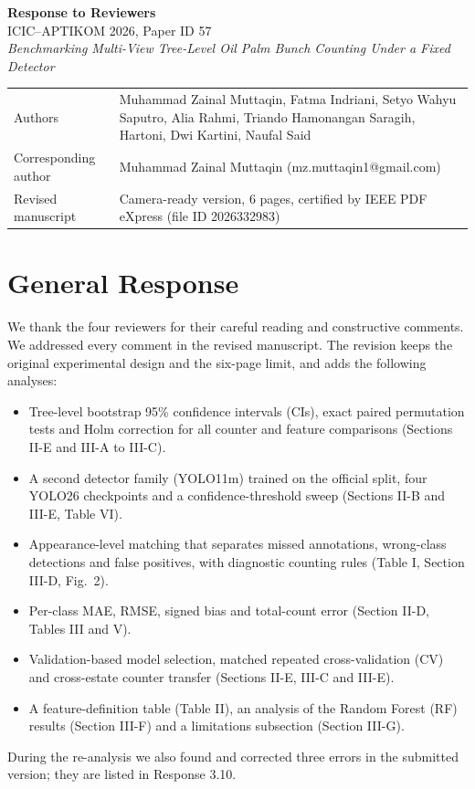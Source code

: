 \documentclass[10pt,a4paper]{article}
\begin{document}
\begin{center}
{\LARGE\bfseries Response to Reviewers}\\[6pt]
{\large ICIC--APTIKOM 2026, Paper ID 57}\\[4pt]
\textit{Benchmarking Multi-View Tree-Level Oil Palm Bunch Counting Under a Fixed Detector}
\end{center}

\vspace{2pt}
\begin{tabularx}{\textwidth}{@{}lX@{}}
Authors & Muhammad Zainal Muttaqin, Fatma Indriani, Setyo Wahyu Saputro, Alia Rahmi,
          Triando Hamonangan Saragih, Hartoni, Dwi Kartini, Naufal Said\\
Corresponding author & Muhammad Zainal Muttaqin (mz.muttaqin1@gmail.com)\\
Revised manuscript & Camera-ready version, 6 pages, certified by IEEE PDF eXpress (file ID 2026332983)\\
\end{tabularx}

\section{General Response}
We thank the four reviewers for their careful reading and constructive comments. We
addressed every comment in the revised manuscript. The revision keeps the original
experimental design and the six-page limit, and adds the following analyses:
\begin{itemize}
\item Tree-level bootstrap 95\% confidence intervals (CIs), exact paired permutation
  tests and Holm correction for all counter and feature comparisons
  (Sections II-E and III-A to III-C).
\item A second detector family (YOLO11m) trained on the official split, four YOLO26
  checkpoints and a confidence-threshold sweep (Sections II-B and III-E, Table VI).
\item Appearance-level matching that separates missed annotations, wrong-class
  detections and false positives, with diagnostic counting rules
  (Table I, Section III-D, Fig.~2).
\item Per-class MAE, RMSE, signed bias and total-count error
  (Section II-D, Tables III and V).
\item Validation-based model selection, matched repeated cross-validation (CV) and
  cross-estate counter transfer (Sections II-E, III-C and III-E).
\item A feature-definition table (Table II), an analysis of the Random Forest (RF)
  results (Section III-F) and a limitations subsection (Section III-G).
\end{itemize}
During the re-analysis we also found and corrected three errors in the submitted
version; they are listed in Response 3.10.
\end{document}
